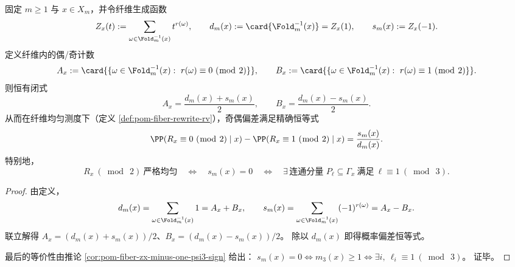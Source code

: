 \begin{theorem}\label{thm:pom-fiber-rewrite-parity-exact-split-mod3-obstruction}
固定 \(m\ge 1\) 与 \(x\in X_m\)，并令纤维生成函数
\[
Z_x(t):=\sum_{\omega\in \Fold_m^{-1}(x)} t^{r(\omega)},
\qquad
d_m(x):=\card{\Fold_m^{-1}(x)}=Z_x(1),
\qquad
s_m(x):=Z_x(-1).
\]
定义纤维内的偶/奇计数
\[
A_x:=\card{\{\omega\in\Fold_m^{-1}(x):\ r(\omega)\equiv 0\ (\bmod\ 2)\}},
\qquad
B_x:=\card{\{\omega\in\Fold_m^{-1}(x):\ r(\omega)\equiv 1\ (\bmod\ 2)\}}.
\]
则恒有闭式
\[
A_x=\frac{d_m(x)+s_m(x)}{2},
\qquad
B_x=\frac{d_m(x)-s_m(x)}{2}.
\]
从而在纤维均匀测度下（定义 \ref{def:pom-fiber-rewrite-rv}），奇偶偏差满足精确恒等式
\[
\PP(R_x\equiv 0\ (\bmod\ 2)\mid x)-\PP(R_x\equiv 1\ (\bmod\ 2)\mid x)=\frac{s_m(x)}{d_m(x)}.
\]
特别地，
\[
R_x\ (\bmod\ 2)\ \text{严格均匀}
\quad\Longleftrightarrow\quad
s_m(x)=0
\quad\Longleftrightarrow\quad
\exists\,\text{连通分量 }P_{\ell}\subseteq \Gamma_x\ \text{满足}\ \ell\equiv 1\ (\bmod\ 3).
\]
\end{theorem}

\begin{proof}
由定义，
\[
d_m(x)=\sum_{\omega\in\Fold_m^{-1}(x)}1=A_x+B_x,
\qquad
s_m(x)=\sum_{\omega\in\Fold_m^{-1}(x)}(-1)^{r(\omega)}=A_x-B_x.
\]
联立解得 \(A_x=(d_m(x)+s_m(x))/2\)、\(B_x=(d_m(x)-s_m(x))/2\)。
除以 \(d_m(x)\) 即得概率偏差恒等式。
\par
最后的等价性由推论 \ref{cor:pom-fiber-zx-minus-one-psi3-sign} 给出：
\(
s_m(x)=0
\Longleftrightarrow
m_3(x)\ge 1
\Longleftrightarrow
\exists i,\ \ell_i\equiv 1\ (\bmod\ 3)
\)。
证毕。
\end{proof}

\endinput
